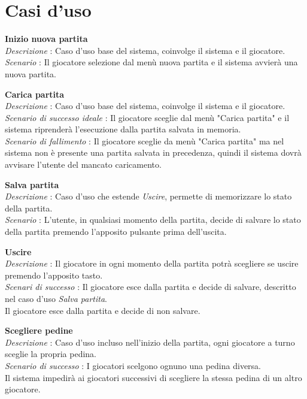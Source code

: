 \documentclass[a4paper]{article}
\begin{document}
\section{Casi d'uso}
\textbf{Inizio nuova partita}\\
\textit{Descrizione} : Caso d'uso base del sistema, coinvolge il sistema e il giocatore.\\
\textit{Scenario} : Il giocatore selezione dal menù nuova partita e il sistema avvierà una nuova partita.

\textbf{Carica partita}\\
\textit{Descrizione} : Caso d'uso base del sistema, coinvolge il sistema e il giocatore.\\
\textit{Scenario di successo ideale} : Il giocatore sceglie  dal menù "Carica partita" e il sistema riprenderà l'esecuzione dalla partita salvata in memoria.\\
\textit{Scenario di fallimento} : Il giocatore sceglie da menù "Carica partita" ma nel sistema non è presente una partita  salvata in precedenza, quindi il sistema dovrà avvisare l'utente del mancato caricamento.

\textbf{Salva partita}\\
\textit{Descrizione} : Caso d'uso che estende \textit{Uscire}, permette di memorizzare lo stato della partita.\\
\textit{Scenario} : L'utente, in qualsiasi momento della partita, decide di salvare lo stato della partita premendo l'apposito pulsante prima dell'uscita.

\textbf{Uscire}\\
\textit{Descrizione} : Il giocatore in ogni momento della partita potrà scegliere se uscire premendo l'apposito tasto.\\
\textit{Scenari di successo} : Il giocatore esce dalla partita e decide di salvare, descritto nel caso d'uso \textit{Salva partita}.\\
Il giocatore esce dalla partita e decide di non salvare.

\textbf{Scegliere pedine}\\
\textit{Descrizione} : Caso d'uso incluso nell'inizio della partita, ogni giocatore a turno sceglie la propria pedina.\\
\textit{Scenario di successo} : I giocatori scelgono ognuno una pedina diversa.\\
Il sistema impedirà ai giocatori successivi di scegliere la stessa pedina di un altro giocatore.
\end{document}
